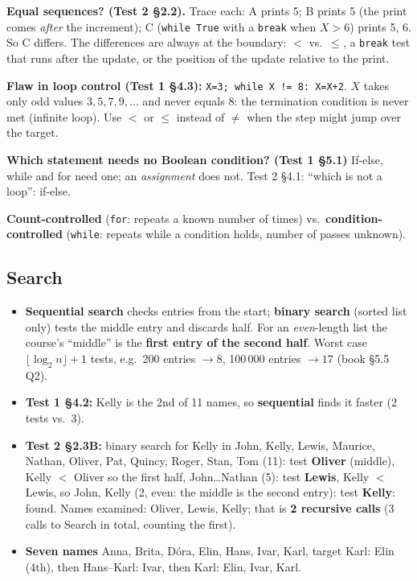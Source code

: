\documentclass{fkt-notes}
\begin{document}
\textbf{Equal sequences? (Test 2 \S2.2).} Trace each: A prints 5; B prints 5 (the print comes
\emph{after} the increment); C (\texttt{while True} with a \texttt{break} when $X>6$) prints 5, 6. So C differs.
The differences are always at the boundary: $<$ vs.\ $\le$, a \texttt{break} test that runs after the update, or the
position of the update relative to the print.

\textbf{Flaw in loop control (Test 1 \S4.3):} \texttt{X=3; while X != 8: X=X+2}. $X$ takes only odd values
$3,5,7,9,\dots$ and never equals 8: the termination condition is never met (infinite loop). Use
$<$ or $\le$ instead of $\ne$ when the step might jump over the target.

\textbf{Which statement needs no Boolean condition? (Test 1 \S5.1)} If-else, while and for need one; an
\emph{assignment} does not. Test 2 \S4.1: ``which is not a loop'': if-else.

\textbf{Count-controlled} (\texttt{for}: repeats a known number of times) vs.\ \textbf{condition-controlled}
(\texttt{while}: repeats while a condition holds, number of passes unknown).

\subsection{Search}
\begin{itemize}[nosep]
  \item \textbf{Sequential search} checks entries from the start; \textbf{binary search} (sorted list only) tests the
        middle entry and discards half. For an \emph{even}-length list the course's ``middle'' is the
        \textbf{first entry of the second half}. Worst case $\lfloor\log_2 n\rfloor+1$ tests, e.g.\ 200 entries $\to8$,
        100\,000 entries $\to17$ (book \S5.5 Q2).
  \item \textbf{Test 1 \S4.2:} Kelly is the 2nd of 11 names, so \textbf{sequential} finds it faster (2 tests vs.\ 3).
  \item \textbf{Test 2 \S2.3B:} binary search for Kelly in John, Kelly, Lewis, Maurice, Nathan, Oliver, Pat, Quincy,
        Roger, Stan, Tom (11): test \textbf{Oliver} (middle), Kelly $<$ Oliver so the first half, John\dots Nathan
        (5): test \textbf{Lewis}, Kelly $<$ Lewis, so John, Kelly (2, even: the middle is the second entry):
        test \textbf{Kelly}: found. Names examined: Oliver, Lewis, Kelly; that is \textbf{2 recursive calls}
        (3 calls to Search in total, counting the first).
  \item \textbf{Seven names} Anna, Brita, Dóra, Elin, Hans, Ivar, Karl, target Karl: Elin (4th), then Hans--Karl: Ivar, then Karl: Elin, Ivar, Karl.
\end{itemize}
\end{document}
